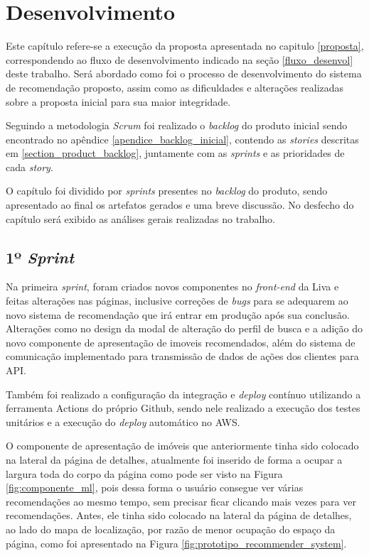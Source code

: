 \chapter{Desenvolvimento}
\label{desenvolvimento}

Este capítulo refere-se a execução da proposta apresentada no capitulo \ref{proposta}, correspondendo ao fluxo de desenvolvimento indicado na seção \ref{fluxo_desenvol} deste trabalho. Será abordado como foi o processo de desenvolvimento do sistema de recomendação proposto, assim como as dificuldades e alterações realizadas sobre a proposta inicial para sua maior integridade.

Seguindo a metodologia \textit{Scrum} foi realizado o \textit{backlog} do produto inicial sendo encontrado no apêndice \ref{apendice_backlog_inicial}, contendo as \textit{stories} descritas em \ref{section_product_backlog}, juntamente com as \textit{sprints} e as prioridades de cada \textit{story}.

O capítulo foi dividido por \textit{sprints} presentes no \textit{backlog} do produto, sendo apresentado ao final os artefatos gerados e uma breve discussão. No desfecho do capítulo será exibido as análises gerais realizadas no trabalho.

\section{1º \textit{Sprint}}

Na primeira \textit{sprint}, foram criados novos componentes no \textit{front-end} da Liva e feitas alterações nas páginas, inclusive correções de \textit{bugs} para se adequarem ao novo sistema de recomendação que irá entrar em produção após sua conclusão. Alterações como no design da modal de alteração do perfil de busca e a adição do novo componente de apresentação de imoveis recomendados, além do sistema de comunicação implementado para transmissão de dados de ações dos clientes para API.

Também foi realizado a configuração da integração e \textit{deploy} contínuo utilizando a ferramenta Actions do próprio Github, sendo nele realizado a execução dos testes unitários e a execução do \textit{deploy} automático no AWS.

O componente de apresentação de imóveis que anteriormente tinha sido colocado na lateral da página de detalhes, atualmente foi inserido de forma a ocupar a largura toda do corpo da página como pode ser visto na Figura \ref{fig:componente_ml}, pois dessa forma o usuário consegue ver várias recomendações ao mesmo tempo, sem precisar ficar clicando mais vezes para ver recomendações. Antes, ele tinha sido colocado na lateral da página de detalhes, ao lado do mapa de localização, por razão de menor ocupação do espaço da página, como foi apresentado na Figura \ref{fig:prototipo_recommender_system}.

